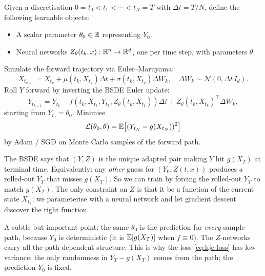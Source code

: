 \begin{definition}
\label{def:hje}
Given a discretisation $0 = t_0 < t_1 < \cdots < t_N = T$ with $\Delta t = T/N$, define the following learnable objects:
\begin{itemize}
  \item A scalar parameter $\theta_0 \in \mathbb{R}$ representing $Y_0$.
  \item Neural networks $Z_\theta(t_k, x) : \mathbb{R}^n \to \mathbb{R}^d$, one per time step, with parameters $\theta$.
\end{itemize}
Simulate the forward trajectory via Euler--Maruyama:
\begin{equation}
  X_{t_{k+1}} = X_{t_k} + \mu(t_k, X_{t_k}) \Delta t + \sigma(t_k, X_{t_k}) \Delta W_k, \quad \Delta W_k \sim \mathcal{N}(0, \Delta t \, I_d).
\end{equation}
Roll $Y$ forward by inverting the BSDE Euler update:
\begin{equation}
  Y_{t_{k+1}} = Y_{t_k} - f(t_k, X_{t_k}, Y_{t_k}, Z_\theta(t_k, X_{t_k})) \Delta t + Z_\theta(t_k, X_{t_k})^\top \Delta W_k,
  \label{eq:hje-roll}
\end{equation}
starting from $Y_{t_0} = \theta_0$. Minimise
\begin{equation}
  \mathcal{L}(\theta_0, \theta) = \mathbb{E}\bigl[(Y_{t_N} - g(X_{t_N}))^2\bigr]
  \label{eq:hje-loss}
\end{equation}
by Adam / SGD on Monte Carlo samples of the forward path.
\end{definition}

\begin{intuition}
The BSDE says that $(Y, Z)$ is the unique adapted pair making $Y$ hit $g(X_T)$ at terminal time. Equivalently: any \emph{other} guess for $(Y_0, Z(t, x))$ produces a rolled-out $Y_T$ that misses $g(X_T)$. So we can train by forcing the rolled-out $Y_T$ to match $g(X_T)$. The only constraint on $Z$ is that it be a function of the current state $X_{t_k}$; we parameterise with a neural network and let gradient descent discover the right function.

A subtle but important point: the same $\theta_0$ is the prediction for \emph{every} sample path, because $Y_0$ is deterministic (it is $\mathbb{E}[g(X_T)]$ when $f \equiv 0$). The $Z$-networks carry all the path-dependent structure. This is why the loss \eqref{eq:hje-loss} has low variance: the only randomness in $Y_T - g(X_T)$ comes from the path; the prediction $Y_0$ is fixed.
\end{intuition}


